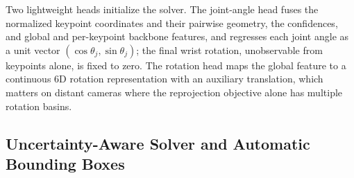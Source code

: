 Two lightweight heads initialize the solver. The joint-angle head fuses the normalized keypoint coordinates and their pairwise geometry, the confidences, and global and per-keypoint backbone features, and regresses each joint angle as a unit vector $(\cos\theta_j, \sin\theta_j)$; the final wrist rotation, unobservable from keypoints alone, is fixed to zero. The rotation head maps the global feature to a continuous 6D rotation representation \cite{zhou2019continuity} with an auxiliary translation, which matters on distant cameras where the reprojection objective alone has multiple rotation basins.

\subsection{Uncertainty-Aware Solver and Automatic Bounding Boxes}
\label{sec:solver}

